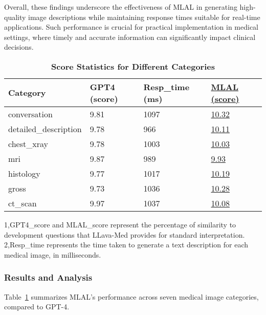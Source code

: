 \documentclass[10pt,letterpaper]{article}
\begin{document}
Overall, these findings underscore the effectiveness of MLAL in generating high-quality image descriptions while maintaining response times suitable for real-time applications. Such performance is crucial for practical implementation in medical settings, where timely and accurate information can significantly impact clinical decisions.

\begin{table}[!ht]
    \centering
    \caption{\bf Score Statistics for Different Categories}\label{tab:7}
    \begin{tabular}{@{}l|l|l|l@{}}
        \toprule
        Category & GPT4 (score\footnotemark[1]) & Resp\_time (ms\footnotemark[2]) & \underline{MLAL (score\footnotemark[1])}  \\
        \midrule
        conversation & 9.81 & 1097 & \underline{10.32}  \\
        \hline
        detailed\_description & 9.78 & 966 & \underline{10.11}  \\
        \hline
        chest\_xray & 9.78 & 1003 & \underline{10.03}  \\
        \hline
        mri & 9.87 & 989 & \underline{9.93}  \\
        \hline
        histology & 9.77 & 1017 & \underline{10.19}  \\
        \hline
        gross & 9.73 & 1036 & \underline{10.28} \\
        \hline
        ct\_scan & 9.97 & 1037 & \underline{10.08} \\
        \hline
        
    \end{tabular}
    
\begin{flushleft} 
1,GPT4\_score and MLAL\_score represent the percentage of similarity to development questions that LLava-Med provides for standard interpretation. \\
2,Resp\_time represents the time taken to generate a text description for each medical image, in milliseconds.
\end{flushleft}
\end{table}

\subsubsection*{Results and Analysis}

Table~\ref{tab:7} summarizes MLAL’s performance across seven medical image categories, compared to GPT-4. 
\end{document}
